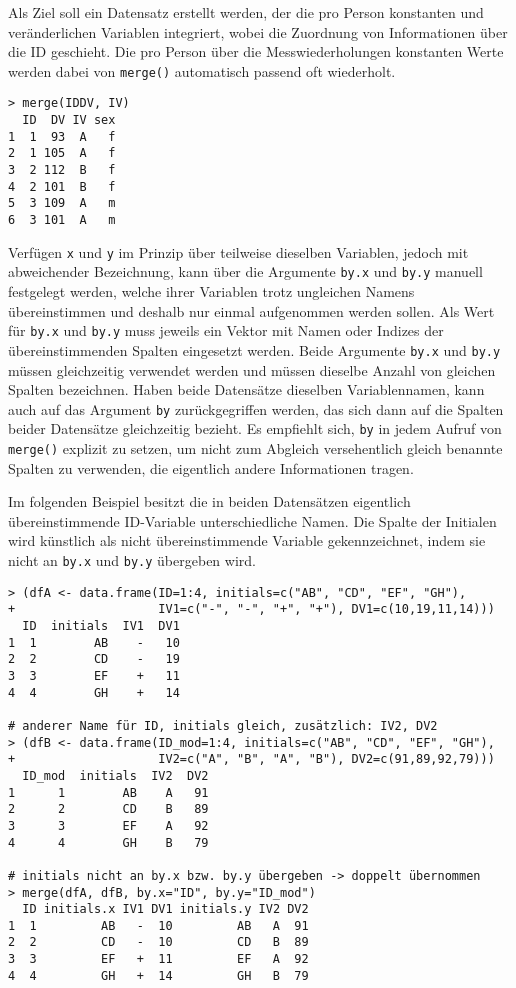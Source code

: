 Als Ziel soll ein Datensatz erstellt werden, der die pro Person konstanten und veränderlichen Variablen integriert, wobei die Zuordnung von Informationen über die ID geschieht. Die pro Person über die Messwiederholungen konstanten Werte werden dabei von \lstinline!merge()! automatisch passend oft wiederholt.
\begin{lstlisting}
> merge(IDDV, IV)
  ID  DV IV sex
1  1  93  A   f
2  1 105  A   f
3  2 112  B   f
4  2 101  B   f
5  3 109  A   m
6  3 101  A   m
\end{lstlisting}

Verfügen \lstinline!x! und \lstinline!y! im Prinzip über teilweise dieselben Variablen, jedoch mit abweichender Bezeichnung, kann über die Argumente \lstinline!by.x! und \lstinline!by.y! manuell festgelegt werden, welche ihrer Variablen trotz ungleichen Namens übereinstimmen und deshalb nur einmal aufgenommen werden sollen. Als Wert für \lstinline!by.x! und \lstinline!by.y! muss jeweils ein Vektor mit Namen oder Indizes der übereinstimmenden Spalten eingesetzt werden. Beide Argumente \lstinline!by.x! und \lstinline!by.y! müssen gleichzeitig verwendet werden und müssen dieselbe Anzahl von gleichen Spalten bezeichnen. Haben beide Datensätze dieselben Variablennamen, kann auch auf das Argument \lstinline!by! zurückgegriffen werden, das sich dann auf die Spalten beider Datensätze gleichzeitig bezieht. Es empfiehlt sich, \lstinline!by! in jedem Aufruf von \lstinline!merge()! explizit zu setzen, um nicht zum Abgleich versehentlich gleich benannte Spalten zu verwenden, die eigentlich andere Informationen tragen.

Im folgenden Beispiel besitzt die in beiden Datensätzen eigentlich übereinstimmende ID-Variable unterschiedliche Namen. Die Spalte der Initialen wird künstlich als nicht übereinstimmende Variable gekennzeichnet, indem sie nicht an \lstinline!by.x! und \lstinline!by.y! übergeben wird.
\begin{lstlisting}
> (dfA <- data.frame(ID=1:4, initials=c("AB", "CD", "EF", "GH"),
+                    IV1=c("-", "-", "+", "+"), DV1=c(10,19,11,14)))
  ID  initials  IV1  DV1
1  1        AB    -   10
2  2        CD    -   19
3  3        EF    +   11
4  4        GH    +   14

# anderer Name für ID, initials gleich, zusätzlich: IV2, DV2
> (dfB <- data.frame(ID_mod=1:4, initials=c("AB", "CD", "EF", "GH"),
+                    IV2=c("A", "B", "A", "B"), DV2=c(91,89,92,79)))
  ID_mod  initials  IV2  DV2
1      1        AB    A   91
2      2        CD    B   89
3      3        EF    A   92
4      4        GH    B   79

# initials nicht an by.x bzw. by.y übergeben -> doppelt übernommen
> merge(dfA, dfB, by.x="ID", by.y="ID_mod")
  ID initials.x IV1 DV1 initials.y IV2 DV2
1  1         AB   -  10         AB   A  91
2  2         CD   -  10         CD   B  89
3  3         EF   +  11         EF   A  92
4  4         GH   +  14         GH   B  79
\end{lstlisting}

